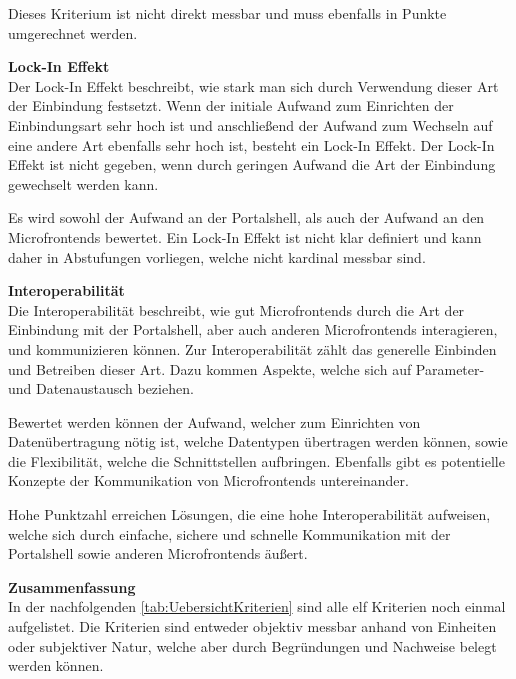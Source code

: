 Dieses Kriterium ist nicht direkt messbar und muss ebenfalls in Punkte umgerechnet werden.

\textbf{Lock-In Effekt}\\
Der Lock-In Effekt beschreibt, wie stark man sich durch Verwendung dieser Art der Einbindung festsetzt. Wenn der initiale Aufwand zum Einrichten der Einbindungsart sehr hoch ist und anschließend der Aufwand zum Wechseln auf eine andere Art ebenfalls sehr hoch ist, besteht ein Lock-In Effekt. Der Lock-In Effekt ist nicht gegeben, wenn durch geringen Aufwand die Art der Einbindung gewechselt werden kann.

Es wird sowohl der Aufwand an der Portalshell, als auch der Aufwand an den Microfrontends bewertet. Ein Lock-In Effekt ist nicht klar definiert und kann daher in Abstufungen vorliegen, welche nicht kardinal messbar sind.

\textbf{Interoperabilität}\\
Die Interoperabilität beschreibt, wie gut Microfrontends durch die Art der Einbindung mit der Portalshell, aber auch anderen Microfrontends interagieren, und kommunizieren können. Zur Interoperabilität zählt das generelle Einbinden und Betreiben dieser Art. Dazu kommen Aspekte, welche sich auf Parameter- und Datenaustausch beziehen.

Bewertet werden können der Aufwand, welcher zum Einrichten von Datenübertragung nötig ist, welche Datentypen übertragen werden können, sowie die Flexibilität, welche die Schnittstellen aufbringen. Ebenfalls gibt es potentielle Konzepte der Kommunikation von Microfrontends untereinander.

Hohe Punktzahl erreichen Lösungen, die eine hohe Interoperabilität aufweisen, welche sich durch einfache, sichere und schnelle Kommunikation mit der Portalshell sowie anderen Microfrontends äußert.

\textbf{Zusammenfassung}\\
In der nachfolgenden \cref{tab:UebersichtKriterien} sind alle elf Kriterien noch einmal aufgelistet. Die Kriterien sind entweder objektiv messbar anhand von Einheiten oder subjektiver Natur, welche aber durch Begründungen und Nachweise belegt werden können.

